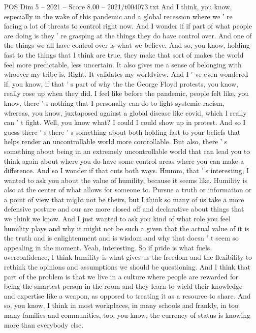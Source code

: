 \begin{textsample}{POS Dim 5 – 2021 – Score 8.00 – 2021/t004073.txt}
And I think, you know, especially in the wake of this pandemic and a global recession where we ' re facing a lot of threats to control right now.
And I wonder if if part of what people are doing is they ' re grasping at the things they do have control over.
And one of the things we all have control over is what we believe.
And so, you know, holding fast to the things that I think are true, they make that sort of makes the world feel more predictable, less uncertain.
It also gives me a sense of belonging with whoever my tribe is.
Right.
It validates my worldview.
And I ' ve even wondered if, you know, if that ' s part of why the the George Floyd protests, you know, really rose up when they did.
I feel like before the pandemic, people felt like, you know, there ' s nothing that I personally can do to fight systemic racism, whereas, you know, juxtaposed against a global disease like covid, which I really can ' t fight.
Well, you know what?
I could I could show up in protest.
And so I guess there ' s there ' s something about both holding fast to your beliefs that helps render an uncontrollable world more controllable.
But also, there ' s something about being in an extremely uncontrollable world that can lead you to think again about where you do have some control areas where you can make a difference.
And so I wonder if that cuts both ways.
Hmmm, that ' s interesting, I wanted to ask you about the value of humility, because it seems like.
Humility is also at the center of what allows for someone to.
Pursue a truth or information or a point of view that might not be theirs, but I think so many of us take a more defensive posture and our are more closed off and declarative about things that we think we know.
And I just wanted to ask you kind of what role you feel humility plays and why it might not be such a given that the actual value of it is the truth and is enlightenment and is wisdom and why that doesn ' t seem so appealing in the moment.
Yeah, interesting.
So if pride is what fuels overconfidence, I think humility is what gives us the freedom and the flexibility to rethink the opinions and assumptions we should be questioning.
And I think that part of the problem is that we live in a culture where people are rewarded for being the smartest person in the room and they learn to wield their knowledge and expertise like a weapon, as opposed to treating it as a resource to share.
And so, you know, I think in most workplaces, in many schools and frankly, in too many families and communities, too, you know, the currency of status is knowing more than everybody else.

\end{textsample}
